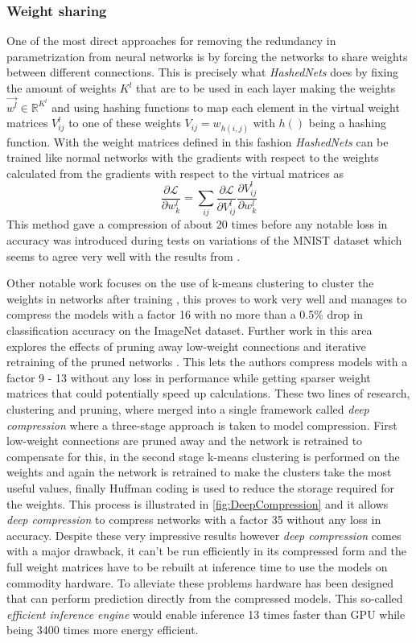 \documentclass{kththesis}
\newcommand{\bibentry}[1]{\parencite{#1}}
\begin{document}
\subsubsection{Weight sharing}
One of the most direct approaches for removing the redundancy in parametrization
from neural networks is by forcing the networks to share weights between
different connections. This is precisely what \emph{HashedNets}
\bibentry{chen2015compressing} does by fixing the amount of weights \(K^l\) that
are to be used in each layer making the weights \(\vec{w^l} \in
\mathbb{R}^{K^l}\) and using hashing functions to map each element in the
virtual weight matrices \(V_{ij}^l\) to one of these weights \(V_{ij} =
w_{h(i,j)}\) with \(h()\) being a hashing function. With the weight matrices
defined in this fashion \emph{HashedNets} can be trained like normal networks
with the gradients with respect to the weights calculated from the gradients
with respect to the virtual matrices as  
\[ \frac{\partial\mathcal{L}}{\partial w_k^l} = \sum_{ij} \frac{\partial\mathcal{L}}{\partial V_{ij}^l}\frac{\partial V_{ij}^l}{\partial w_k^l} \]
This method gave a compression of about 20 times before any notable loss in
accuracy was introduced during tests on variations of the MNIST dataset which
seems to agree very well with the results from \bibentry{denil2013predicting}. 

Other notable work focuses on the use of k-means clustering to cluster the
weights in networks after training \bibentry{gong2014compressing}, this proves
to work very well and manages to compress the models with a factor 16 with no
more than a 0.5\% drop in classification accuracy on the ImageNet dataset.
Further work in this area explores the effects of pruning away low-weight
connections and iterative retraining of the pruned networks
\bibentry{han2015learning}. This lets the authors compress models with a factor
9 - 13 without any loss in performance while getting sparser weight matrices
that could potentially speed up calculations. These two lines of research,
clustering and pruning, where merged into a single framework called \emph{deep
  compression} \bibentry{han2015deep} where a three-stage approach is taken to
model compression. First low-weight connections are pruned away and the network
is retrained to compensate for this, in the second stage k-means clustering is
performed on the weights and again the network is retrained to make the clusters
take the most useful values, finally Huffman coding
\bibentry{van1976construction} is used to reduce the storage required for the
weights. This process is illustrated in \cref{fig:DeepCompression} and it allows \emph{deep compression} to compress networks with a
factor 35 without any loss in accuracy. Despite these very impressive results
however \emph{deep compression} comes with a major drawback, it can't be run
efficiently in its compressed form and the full weight matrices have to be
rebuilt at inference time to use the models on commodity hardware. To alleviate
these problems hardware has been designed that can perform prediction directly
from the compressed models. This so-called \emph{efficient inference engine}
\bibentry{han2016eie} would enable inference 13 times faster than GPU while
being 3400 times more energy efficient.  
\end{document}
